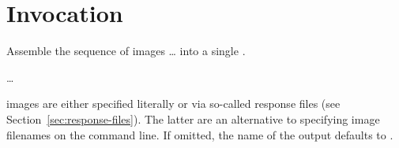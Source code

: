 

\chapter[Invocation]{Invocation
  \label{sec:invocation}
  }


\noindent Assemble the sequence of images \dots{} into
a single .

\smallskip

\code{\app} 
 \dots

\smallskip

\noindent {} images are either specified
literally  or via
so-called response files (see
Section~\ref{sec:response-files}).  The latter are an alternative to
specifying image filenames on the command line.  If omitted, the name
of the output  defaults to
.






